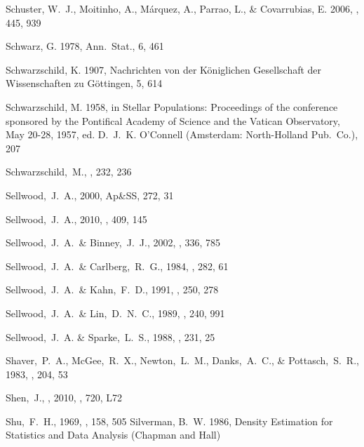 \begin{thebibliography}{99}
{Schuster}, W.~J., {Moitinho}, A., {M{\'a}rquez}, A., {Parrao}, L., \&
  {Covarrubias}, E. 2006, \aap, 445, 939

{Schwarz}, G. 1978, {Ann.~Stat.}, 6, 461

{Schwarzschild}, K. 1907, {Nachrichten von der K{\"o}niglichen Gesellschaft der
  Wissenschaften zu G{\"o}ttingen}, 5, {614}

{Schwarzschild}, M. 1958, in {Stellar Populations: Proceedings of the
  conference sponsored by the Pontifical Academy of Science and the Vatican
  Observatory, May 20-28, 1957}, ed. D.~J.~K. {O'Connell} ({Amsterdam}:
  {North-Holland Pub.~Co.}), 207

  Schwarzschild,~M.,
  \apj, 232, 236

  Sellwood,~J.~A., 2000,
  Ap\&SS, 272, 31

  Sellwood,~J.~A., 2010,
  \mnras, 409, 145

  Sellwood,~J.~A.~\& Binney,~J.~J., 2002,
  \mnras, 336, 785

  Sellwood,~J.~A.~\& Carlberg,~R.~G., 1984,
  \apj, 282, 61

  Sellwood,~J.~A.~\& Kahn,~F.~D., 1991,
  \mnras, 250, 278

  Sellwood,~J.~A.~\& Lin,~D.~N.~C., 1989,
  \mnras, 240, 991

  Sellwood,~J.~A. \& Sparke,~L.~S., 1988,
  \mnras, 231, 25

  Shaver,~P.~A., McGee,~R.~X., Newton,~L.~M., Danks,~A.~C., \& Pottasch,~S.~R., 1983,
  \mnras, 204, 53

  Shen,~J., \etal, 2010, \apj, 720, L72

  Shu,~F.~H., 1969,
  \apj, 158, 505
{Silverman}, B.~W. 1986, {Density Estimation for Statistics and Data Analysis}
  ({Chapman and Hall})


\end{thebibliography}
